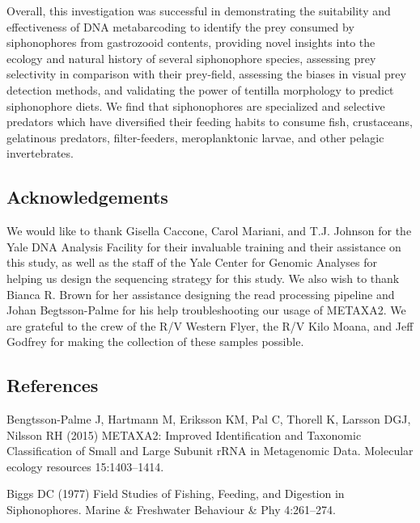 \documentclass[12pt,]{article}
\begin{document}
Overall, this investigation was successful in demonstrating the suitability and effectiveness of DNA metabarcoding to identify the prey consumed by siphonophores from gastrozooid contents, providing novel insights into the ecology and natural history of several siphonophore species, assessing prey selectivity in comparison with their prey-field, assessing the biases in visual prey detection methods, and validating the power of tentilla morphology to predict siphonophore diets. We find that siphonophores are specialized and selective predators which have diversified their feeding habits to consume fish, crustaceans, gelatinous predators, filter-feeders, meroplanktonic larvae, and other pelagic invertebrates.

\hypertarget{acknowledgements}{%
\subsection*{Acknowledgements}\label{acknowledgements}}

We would like to thank Gisella Caccone, Carol Mariani, and T.J. Johnson for the Yale DNA Analysis Facility for their invaluable training and their assistance on this study, as well as the staff of the Yale Center for Genomic Analyses for helping us design the sequencing strategy for this study. We also wish to thank Bianca R. Brown for her assistance designing the read processing pipeline and Johan Begtsson-Palme for his help troubleshooting our usage of METAXA2. We are grateful to the crew of the R/V Western Flyer, the R/V Kilo Moana, and Jeff Godfrey for making the collection of these samples possible.

\hypertarget{references}{%
\subsection*{References}\label{references}}

\hypertarget{refs}{}
\leavevmode\hypertarget{ref-bengtsson2015metaxa2}{}%
Bengtsson-Palme J, Hartmann M, Eriksson KM, Pal C, Thorell K, Larsson DGJ, Nilsson RH (2015) METAXA2: Improved Identification and Taxonomic Classification of Small and Large Subunit rRNA in Metagenomic Data. Molecular ecology resources 15:1403--1414.

\leavevmode\hypertarget{ref-biggs1977field}{}%
Biggs DC (1977) Field Studies of Fishing, Feeding, and Digestion in Siphonophores. Marine \& Freshwater Behaviour \& Phy 4:261--274.
\end{document}
